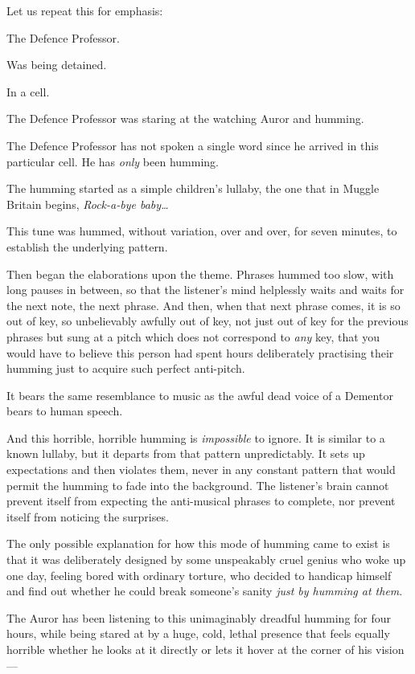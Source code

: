 Let us repeat this for emphasis:

The Defence Professor.

Was being detained.

In a cell.

The Defence Professor was staring at the watching Auror and humming.

The Defence Professor has not spoken a single word since he arrived in this particular cell. He has \emph{only} been humming.

The humming started as a simple children’s lullaby, the one that in Muggle Britain begins, \emph{Rock-a-bye baby…}

This tune was hummed, without variation, over and over, for seven minutes, to establish the underlying pattern.

Then began the elaborations upon the theme. Phrases hummed too slow, with long pauses in between, so that the listener’s mind helplessly waits and waits for the next note, the next phrase. And then, when that next phrase comes, it is so out of key, so unbelievably awfully out of key, not just out of key for the previous phrases but sung at a pitch which does not correspond to \emph{any} key, that you would have to believe this person had spent hours deliberately practising their humming just to acquire such perfect anti-pitch.

It bears the same resemblance to music as the awful dead voice of a Dementor bears to human speech.

And this horrible, horrible humming is \emph{impossible} to ignore. It is similar to a known lullaby, but it departs from that pattern unpredictably. It sets up expectations and then violates them, never in any constant pattern that would permit the humming to fade into the background. The listener’s brain cannot prevent itself from expecting the anti-musical phrases to complete, nor prevent itself from noticing the surprises.

The only possible explanation for how this mode of humming came to exist is that it was deliberately designed by some unspeakably cruel genius who woke up one day, feeling bored with ordinary torture, who decided to handicap himself and find out whether he could break someone’s sanity \emph{just by humming at them}.

The Auror has been listening to this unimaginably dreadful humming for four hours, while being stared at by a huge, cold, lethal presence that feels equally horrible whether he looks at it directly or lets it hover at the corner of his vision—

